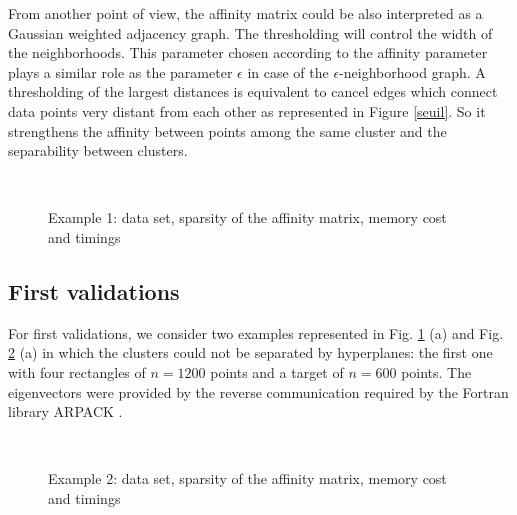 \documentclass{llncs}
\begin{document}
From another point of view, the affinity matrix could be also interpreted as a
Gaussian weighted adjacency graph.
The thresholding will control the width of the neighborhoods. This parameter
chosen according to the affinity parameter  plays a similar role as the
parameter $\epsilon$ in case of the $\epsilon$-neighborhood graph. A
thresholding of the largest distances is equivalent to
cancel edges which connect data points very distant from each other as
represented in Figure \ref{seuil}. So it strengthens the affinity between
points among the same cluster and the separability between clusters.


\begin{figure}[!h]
  \begin{center}
    \hspace{2cm}
    \\
    \hspace{2cm}
  \end{center}
  \caption{Example 1: data set, sparsity of the affinity matrix, memory cost and timings}
  \label{4rect}
 \end{figure}


\subsection{First validations}
For first validations, we consider two examples represented in Fig.
\ref{4rect} (a) and Fig. \ref{cible} (a) in which the clusters could not be
separated by hyperplanes: the first one with four rectangles of $n=1200$ points 
and a target of $n=600$ points.
The eigenvectors were provided by the reverse communication required by the
Fortran library ARPACK \cite{lehoucq1998arpack}.

\begin{figure}[!h]
  \begin{center}
    \hspace{2cm}
    \\
    \hspace{2cm}
  \end{center}
  \caption{Example 2: data set, sparsity of the affinity matrix, memory cost and timings}
  \label{cible}
 \end{figure}
\end{document}
